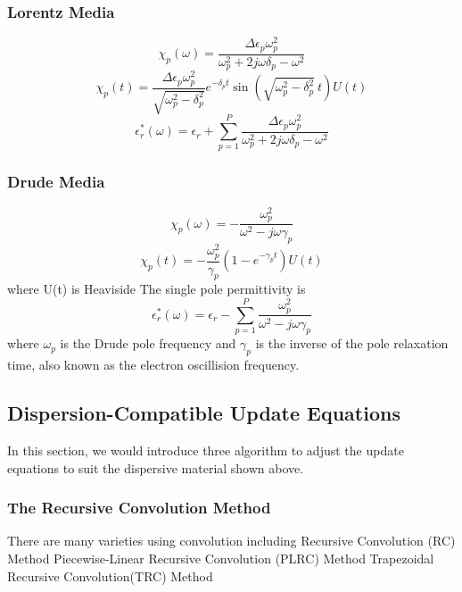 \subsubsection{Lorentz Media}
\begin{equation}
  \chi_p(\omega) = \frac{\Delta\epsilon_p\omega_p^2}{\omega_p^2 + 2j\omega\delta_p - \omega^2}  
\end{equation}
\begin{equation}
  \chi_p(t) = \frac{\Delta \epsilon_p \omega_p^2}{\sqrt{\omega_p^2 - \delta_p^2}}e^{-\delta_p t}\sin\left(\sqrt{\omega_p^2-\delta_p^2}\ t\right)U(t)
\end{equation}
\begin{equation}
  \epsilon_r^*(\omega) = \epsilon_r + \sum_{p=1}^P \frac{\Delta\epsilon_p\omega_p^2}{\omega_p^2 + 2j\omega\delta_p - \omega^2}  
\end{equation}


\subsubsection{Drude Media}
\begin{equation}
  \chi_p(\omega) = -\frac{\omega_p^2}{\omega^2 - j\omega\gamma_p}  
\end{equation}
\begin{equation}
  \chi_p(t) = -\frac{\omega_p^2}{\gamma_p}\left(1-e^{-\gamma_p t}\right) U(t)
\end{equation}
where U(t) is Heaviside
The single pole permittivity is 
\begin{equation}
  \epsilon_r^*(\omega) = \epsilon_r - \sum_{p=1}^P \frac{\omega_p^2}{\omega^2-j\omega\gamma_p}
\end{equation}
where $\omega_p$ is the Drude pole frequency and $\gamma_p$ is the inverse of the pole relaxation time, also known as the
electron oscillision frequency.



\subsection{Dispersion-Compatible Update Equations}
In this section, we would introduce three algorithm to adjust the update equations to suit the dispersive material shown
above.

\subsubsection{The Recursive Convolution Method}
There are many varieties using convolution including
Recursive Convolution (RC) Method
Piecewise-Linear Recursive Convolution (PLRC) Method
Trapezoidal Recursive Convolution(TRC) Method

